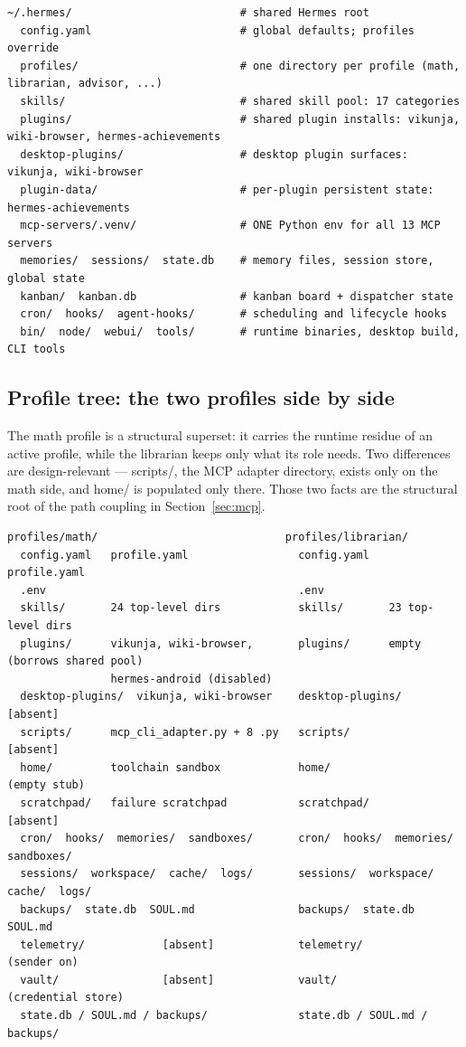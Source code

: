 \documentclass[10pt]{article}
\newcommand{\mono}[1]{{\ttfamily\small #1}}
\begin{document}
\begin{lstlisting}[label=lst:hermesroot]
~/.hermes/                          # shared Hermes root
  config.yaml                       # global defaults; profiles override
  profiles/                         # one directory per profile (math, librarian, advisor, ...)
  skills/                           # shared skill pool: 17 categories
  plugins/                          # shared plugin installs: vikunja, wiki-browser, hermes-achievements
  desktop-plugins/                  # desktop plugin surfaces: vikunja, wiki-browser
  plugin-data/                      # per-plugin persistent state: hermes-achievements
  mcp-servers/.venv/                # ONE Python env for all 13 MCP servers
  memories/  sessions/  state.db    # memory files, session store, global state
  kanban/  kanban.db                # kanban board + dispatcher state
  cron/  hooks/  agent-hooks/       # scheduling and lifecycle hooks
  bin/  node/  webui/  tools/       # runtime binaries, desktop build, CLI tools
\end{lstlisting}

\subsection*{Profile tree: the two profiles side by side}

The math profile is a structural superset: it carries the runtime residue of an active profile,
while the librarian keeps only what its role needs. Two differences are design-relevant ---
\mono{scripts/}, the MCP adapter directory, exists only on the math side, and \mono{home/} is
populated only there. Those two facts are the structural root of the path coupling in
Section~\ref{sec:mcp}.

\begin{lstlisting}[label=lst:profiletree]
profiles/math/                             profiles/librarian/
  config.yaml   profile.yaml                 config.yaml   profile.yaml
  .env                                       .env
  skills/       24 top-level dirs            skills/       23 top-level dirs
  plugins/      vikunja, wiki-browser,       plugins/      empty (borrows shared pool)
                hermes-android (disabled)
  desktop-plugins/  vikunja, wiki-browser    desktop-plugins/     [absent]
  scripts/      mcp_cli_adapter.py + 8 .py   scripts/             [absent]
  home/         toolchain sandbox            home/                (empty stub)
  scratchpad/   failure scratchpad           scratchpad/          [absent]
  cron/  hooks/  memories/  sandboxes/       cron/  hooks/  memories/  sandboxes/
  sessions/  workspace/  cache/  logs/       sessions/  workspace/  cache/  logs/
  backups/  state.db  SOUL.md                backups/  state.db  SOUL.md
  telemetry/            [absent]             telemetry/           (sender on)
  vault/                [absent]             vault/               (credential store)
  state.db / SOUL.md / backups/              state.db / SOUL.md / backups/
\end{lstlisting}
\end{document}
